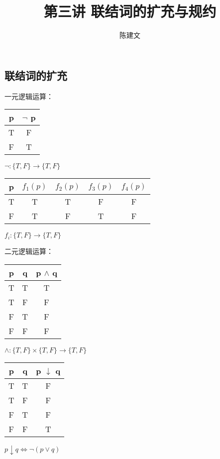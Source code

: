 \documentclass{article}
\begin{document}
\begin{CJK*}{UTF8}{gbsn}
  \title{第三讲 联结词的扩充与规约}
  \author{陈建文}
  \maketitle

  \section{联结词的扩充}

  一元逻辑运算：

  \begin{tabular}{c|c}
    p& $\lnot$ p\\
    \hline
    T&F\\
    F&T\\
  \end{tabular}

  $\lnot: \{T,F\}\to\{T,F\}$

  \begin{tabular}{c|cccc}
    p& $f_1(p)$ & $f_2(p)$ & $f_3(p)$ & $f_4(p)$ \\
    \hline
    T&T&T&F&F\\
    F&T&F&T&F\\
  \end{tabular}

  $f_i:\{T,F\}\to \{T,F\}$

  二元逻辑运算：

  \begin{tabular}{cc|c}
    p& q& p $\land$ q\\
    \hline
    T&T&T\\
    T&F&F\\
    F&T&F\\
    F&F&F\\
  \end{tabular}

  $\land : \{T,F\}\times \{T,F\}\to \{T,F\}$


  \begin{tabular}{cc|c}
    p& q& p $\downarrow$ q\\
    \hline
    T&T&F\\
    T&F&F\\
    F&T&F\\
    F&F&T\\
  \end{tabular}

  $p\downarrow q \Leftrightarrow \lnot (p\lor q)$



\end{CJK*}
\end{document}
